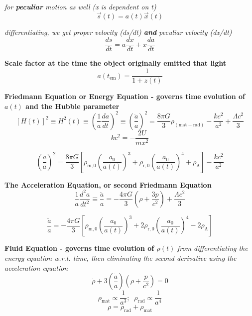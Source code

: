 \documentclass{spy}
\begin{document}
\textit {for \textbf{peculiar} motion as well (x is dependent on t)}
\begin{equation}
\vec{s}(t) = a(t) \vec{x}(t)
\end{equation}

\textit{differentiating, we get proper velocity (ds/dt) \textbf{and} peculiar velocity (dx/dt)}
\begin{equation}
\frac {ds}{dt} = a \frac {dx}{dt} + x \frac {da}{dt}
\end{equation}

\textbf {Scale factor at the time the object originally emitted that light}
\begin{equation}
a(t_\mathrm{em}) = \frac {1}{1 + z(t)}
\end{equation}

\textbf {Friedmann Equation or Energy Equation - governs time evolution of \(a(t)\) and the Hubble parameter}
\begin{equation}
\left[H(t)\right]^2  \equiv  H^2(t)  \equiv \left(\frac {1}{a} \frac {da}{dt}\right)^2 \equiv \left(\frac {\dot{a}}{a}\right)^2 = \frac {8 \pi G}{3} \rho_\mathrm{(mat+rad)} - \frac {k c^2}{a^2} + \frac {\Lambda c^2}{3}
\end{equation}
\begin{equation}
k c^2 = - \frac {2U}{m x^2}  
\end{equation}

\begin{equation}
\left(\frac {\dot{a}}{a}\right)^2 = \frac {8 \pi G}{3} \left[ \rho_\mathrm{m,0} \left( \frac {a_\mathrm{0}}{a(t)} \right)^3 + \rho_\mathrm{r,0} \left(\frac {a_\mathrm{0}}{a(t)} \right)^4 + \rho_\mathrm{\Lambda} \right] - \frac {kc^2}{a^2}
\end{equation}

\textbf {The Acceleration Equation, or second Friedmann Equation}
\begin{equation}
\frac {1}{a} \frac {d^2a}{dt^2}\equiv \frac {\ddot{a}}{a} = - \frac {4 \pi G}{3} \left(\rho + \frac {3p}{c^2}\right) + \frac {\Lambda c^2}{3}
\end{equation}

\begin{equation}
\frac {\ddot{a}}{a} = - \frac {4 \pi G}{3} \left[ \rho_\mathrm{m,0} \left( \frac {a_\mathrm{0}}{a(t)} \right)^3 + 2\rho_\mathrm{r,0} \left(\frac {a_\mathrm{0}}{a(t)} \right)^4 -2\rho_\mathrm{\Lambda} \right]
\end{equation}

\textbf {Fluid Equation - governs time evolution of \(\rho(t)\)}
\textit {from differentiating the energy equation w.r.t. time, then eliminating the second derivative using the acceleration equation}
\begin{equation}
\dot{\rho} +3 \left(\frac {\dot{a}}{a}\right) \left(\rho + \frac {p}{c^2}\right) = 0
\end{equation}
\begin{equation}
\rho_{\mathrm{mat}} \propto \frac {1}{a^3} ; \; \; \rho_{\mathrm{rad}} \propto \frac {1}{a^4}
\end{equation}
\begin{equation}
\rho =  \rho_{\mathrm{rad}} + \rho_{\mathrm{mat}} 
\end{equation}
\end{document}

